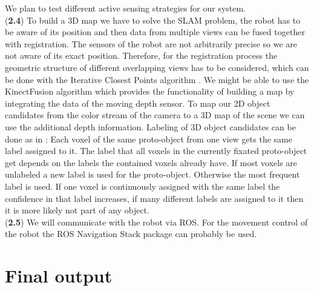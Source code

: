\documentclass[a4paper,11pt,english]{article}
\begin{document}
We plan to test different active sensing strategies for our system.\\
(\textbf{2.4}) To build a 3D map we have to solve the SLAM problem, the robot has to be aware of its position and then data from multiple views can be fused together with registration.
The sensors of the robot are not arbitrarily precise so we are not aware of its exact position. Therefore, for the registration process the geometric structure of different overlapping views has to be considered, which can be done with the Iterative Closest Points algorithm \cite{surmann2003autonomous}.
We might be able to use the KinectFusion algorithm which provides the functionality of building a map by integrating the data of the moving depth sensor.
To map our 2D object candidates from the color stream of the camera to a 3D map of the scene we can use the additional depth information.
Labeling of 3D object candidates can be done as in \cite{garcia2013computational}:
Each voxel of the same proto-object from one view gets the same label assigned to it.
The label that all voxels in the currently fixated proto-object get depends on the labels the contained voxels already have.
If most voxels are unlabeled a new label is used for the proto-object.
Otherwise the most frequent label is used.
If one voxel is continuously assigned with the same label the confidence in that label increases, if many different labels are assigned to it then it is more likely not part of any object.\\
(\textbf{2.5}) We will communicate with the robot via ROS. For the movement control of the robot the ROS Navigation Stack package can probably be used.

\section{Final output}
\end{document}
